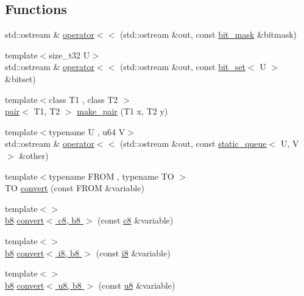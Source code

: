 \subsection*{Functions}
\begin{DoxyCompactItemize}
\item 
std\-::ostream \& \hyperlink{namespacecrap_a8aaf955ef754e76788b2ca6c21a9188f}{operator$<$$<$} (std\-::ostream \&out, const \hyperlink{classcrap_1_1bit__mask}{bit\-\_\-mask} \&bitmask)
\item 
{\footnotesize template$<$size\-\_\-t32 U$>$ }\\std\-::ostream \& \hyperlink{namespacecrap_a0c66ba04df85721d29335b9bd678b808}{operator$<$$<$} (std\-::ostream \&out, const \hyperlink{classcrap_1_1bit__set}{bit\-\_\-set}$<$ U $>$ \&bitset)
\item 
{\footnotesize template$<$class T1 , class T2 $>$ }\\\hyperlink{structcrap_1_1pair}{pair}$<$ T1, T2 $>$ \hyperlink{namespacecrap_a8d4a14194dcafc95ae3d1eb4fa1eeb37}{make\-\_\-pair} (T1 x, T2 y)
\item 
{\footnotesize template$<$typename U , u64 V$>$ }\\std\-::ostream \& \hyperlink{namespacecrap_a77397b083ab85f2f96b738f633cee965}{operator$<$$<$} (std\-::ostream \&out, const \hyperlink{classcrap_1_1static__queue}{static\-\_\-queue}$<$ U, V $>$ \&other)
\item 
{\footnotesize template$<$typename F\-R\-O\-M , typename T\-O $>$ }\\T\-O \hyperlink{namespacecrap_afe6bc6d7a278bda669ff709f655b8789}{convert} (const F\-R\-O\-M \&variable)
\item 
{\footnotesize template$<$$>$ }\\\hyperlink{types_8h_a74eb47b4ab9e428eab7b91b3b877fa6c}{b8} \hyperlink{namespacecrap_a238deb14785065efc03696d816a4c5f9}{convert$<$ c8, b8 $>$} (const \hyperlink{types_8h_aa1ba8aac9fcd831012308297336ac74b}{c8} \&variable)
\item 
{\footnotesize template$<$$>$ }\\\hyperlink{types_8h_a74eb47b4ab9e428eab7b91b3b877fa6c}{b8} \hyperlink{namespacecrap_ac68cffedf6f2cf6d8298fe76c9e7c4e5}{convert$<$ i8, b8 $>$} (const \hyperlink{types_8h_ae3702327b5f47e83b431e22b33da7b58}{i8} \&variable)
\item 
{\footnotesize template$<$$>$ }\\\hyperlink{types_8h_a74eb47b4ab9e428eab7b91b3b877fa6c}{b8} \hyperlink{namespacecrap_a91a0af986f85ba3ee465ec1c169cd16f}{convert$<$ u8, b8 $>$} (const \hyperlink{types_8h_a92c50087ca0e64fa93fc59402c55f8ca}{u8} \&variable)

\end{DoxyCompactItemize}
